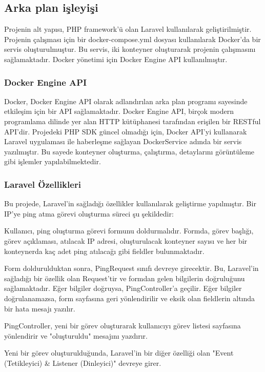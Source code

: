 \subsection{Arka plan işleyişi}
Projenin alt yapısı, PHP framework'ü olan Laravel kullanılarak geliştirilmiştir. Projenin çalışması için bir docker-compose.yml dosyası kullanılarak Docker'da bir servis oluşturulmuştur. Bu servis, iki konteyner oluşturarak projenin çalışmasını sağlamaktadır. Docker yönetimi için Docker Engine API kullanılmıştır.

\subsubsection{Docker Engine API}

Docker, Docker Engine API olarak adlandırılan arka plan programı sayesinde etkileşim için bir API sağlamaktadır. Docker Engine API, birçok modern programlama dilinde yer alan HTTP kütüphanesi tarafından erişilen bir RESTful API'dir. Projedeki PHP SDK güncel olmadığı için, Docker API'yi kullanarak Laravel uygulaması ile haberleşme sağlayan DockerService adında bir servis yazılmıştır. Bu sayede konteyner oluşturma, çalıştırma, detaylarını görüntüleme gibi işlemler yapılabilmektedir.

\subsubsection{Laravel Özellikleri}

Bu projede, Laravel'in sağladığı özellikler kullanılarak geliştirme yapılmıştır. Bir IP'ye ping atma görevi oluşturma süreci şu şekildedir:

Kullanıcı, ping oluşturma görevi formunu doldurmalıdır. Formda, görev başlığı, görev açıklaması, atılacak IP adresi, oluşturulacak konteyner sayısı ve her bir konteynerda kaç adet ping atılacağı gibi fieldler bulunmaktadır.

Form doldurulduktan sonra, PingRequest sınıfı devreye girecektir. Bu, Laravel'in sağladığı bir özellik olan Request'tir ve formdan gelen bilgilerin doğruluğunu sağlamaktadır. Eğer bilgiler doğruysa, PingController'a geçilir. Eğer bilgiler doğrulanamazsa, form sayfasına geri yönlendirilir ve eksik olan fieldlerin altında bir hata mesajı yazılır.

PingController, yeni bir görev oluşturarak kullanıcıyı görev listesi sayfasına yönlendirir ve "oluşturuldu" mesajını yazdırır.

Yeni bir görev oluşturulduğunda, Laravel'in bir diğer özelliği olan "Event (Tetikleyici) \& Listener (Dinleyici)" devreye girer.

